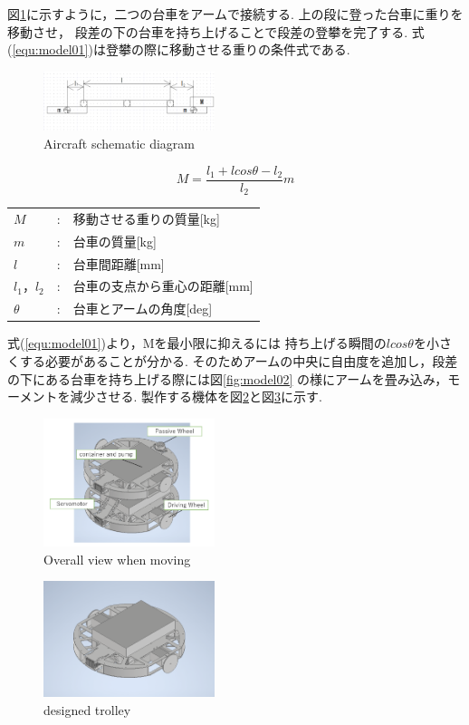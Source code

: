 \documentclass[dvipdfmx]{jsarticle}
\begin{document}
図\ref{fig:model01}に示すように，二つの台車をアームで接続する.
上の段に登った台車に重りを移動させ，
段差の下の台車を持ち上げることで段差の登攀を完了する.
式(\ref*{equ:model01})は登攀の際に移動させる重りの条件式である.
\begin{figure}[H]
  \centering
  \includegraphics[width=50mm]{image/model01}
  \caption{Aircraft schematic diagram}
\label{fig:model01}
\end{figure}
\begin{equation}
  M=\frac{l_1+lcos\theta-l_2}{l_2}m
\label{equ:model01}
\end{equation}
\begin{table}[H]
    \begin{tabular}{lcl}
      $M$ & : & 移動させる重りの質量[kg]\\
      $m$ & : & 台車の質量[kg]\\
      $l$ & : & 台車間距離[mm]\\
      $l_1$，$l_2$ & : & 台車の支点から重心の距離[mm]\\
      $\theta$ & : & 台車とアームの角度[deg]\\
  \end{tabular}
\end{table}
式(\ref*{equ:model01})より，Mを最小限に抑えるには
持ち上げる瞬間の$lcos\theta$を小さくする必要があることが分かる.
そのためアームの中央に自由度を追加し，段差の下にある台車を持ち上げる際には図\ref{fig:model02}
の様にアームを畳み込み，モーメントを減少させる.
製作する機体を図\ref*{fig:move}と図\ref*{fig:CAD}に示す.
\begin{figure}[H]
  \centering
  \includegraphics[width=50mm]{image/kasane.png}
  \caption{Overall view when moving}
  \label{fig:move}
  \end{figure}

\begin{figure}[H]
\centering
\includegraphics[width=50mm]{image/1unit.png}
\caption{designed trolley}
\label{fig:CAD}
\end{figure}
\end{document}
